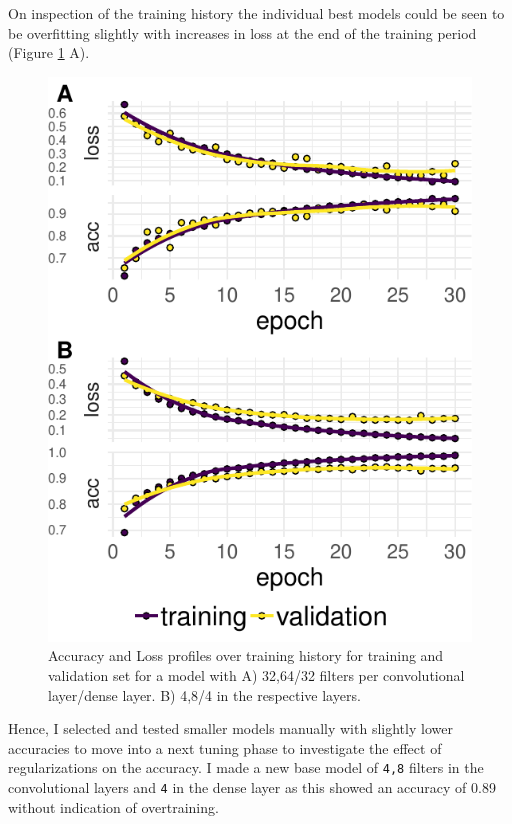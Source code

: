\documentclass[12pt,a4paper,]{article}
\begin{document}
On inspection of the training history the individual best models could be seen to be overfitting slightly with increases in loss at the end of the training period (Figure \ref{fig:largevssmall} A).

\begin{figure}
\centering
\includegraphics{../analysis/figure2.pdf}
\caption{\label{fig:largevssmall}Accuracy and Loss profiles over training history for training and validation set for a model with A) 32,64/32 filters per convolutional layer/dense layer. B) 4,8/4 in the respective layers.}
\end{figure}

Hence, I selected and tested smaller models manually with slightly lower accuracies to move into a next tuning phase to investigate the effect of regularizations on the accuracy. I made a new base model of \texttt{4,8} filters in the convolutional layers and \texttt{4} in the dense layer as this showed an accuracy of 0.89 without indication of overtraining.
\end{document}
